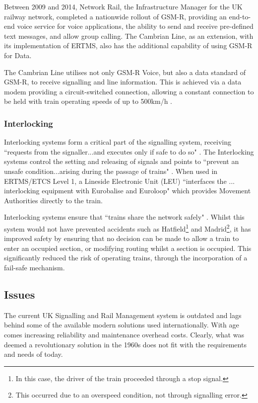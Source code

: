 \documentclass[twoside,11pt,a4paper]{article}
\begin{document}
Between 2009 and 2014, Network Rail, the Infrastructure Manager for the UK railway network, completed a nationwide rollout of GSM-R, providing an end-to-end voice service for voice applications, the ability to send and receive pre-defined text messages, and allow group calling. The Cambrian Line, as an extension, with its implementation of ERTMS, also has the additional capability of using GSM-R for Data.

The Cambrian Line utilises not only GSM-R Voice, but also a data standard of GSM-R, to receive signalling and line information. This is achieved via a data modem providing a circuit-switched connection, allowing a constant connection to be held with train operating speeds of up to 500km/h \citep{ClearCinCom09}.

\subsubsection{Interlocking}
Interlocking systems form a critical part of the signalling system, receiving ``requests from the signaller...and executes only if safe to do so" \citep{RailEngineer13a}. The Interlocking systems control the setting and releasing of signals and points to ``prevent an unsafe condition...arising during the passage of trains" \citep{RSSB14a}. When used in ERTMS/ETCS Level 1, a Lineside Electronic Unit (LEU) ``interfaces the ... interlocking equipment with Eurobalise and Euroloop" \citep[p. 15]{SUBSET-044} which provides Movement Authorities directly to the train.

Interlocking systems ensure that ``trains share the network safely" \citep[pp. 10]{NetworkRail15a}. Whilst this system would not have prevented accidents such as Hatfield\footnote{In this case, the driver of the train proceeded through a stop signal.} and Madrid\footnote{This occurred due to an overspeed condition, not through  signalling error.}, it has improved safety by ensuring that no decision can be made to allow a train to enter an occupied section, or modifying routing whilst a section is occupied. This significantly reduced the risk of operating trains, through the incorporation of a fail-safe mechanism.

\subsection{Issues}
The current UK Signalling and Rail Management system is outdated and lags behind some of the available modern solutions used internationally. With age comes increasing reliability and maintenance overhead costs. Clearly, what was deemed a revolutionary solution in the 1960s does not fit with the requirements and needs of today.
\end{document}
